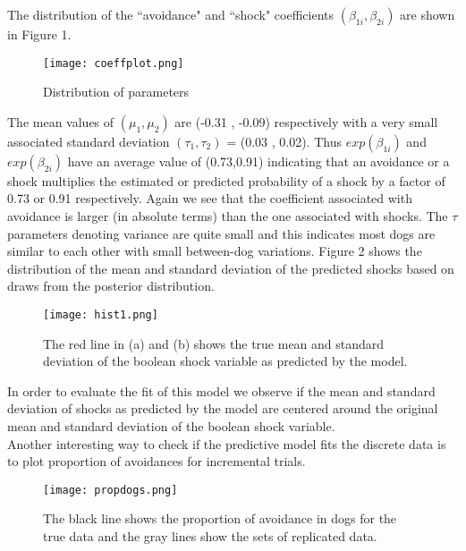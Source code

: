 \documentclass{article}
\begin{document}
The distribution of the ``avoidance" and ``shock" coefficients $(\beta_{1i},\beta_{2i})$ are shown in Figure 1.
 \begin{figure}[H]
\centering
\texttt{[image: coeffplot.png]}
\caption{Distribution of parameters}
\label{deltat}
\end{figure}
The mean values of $(\mu_1, \mu_2)$ are (-0.31 , -0.09) respectively with a very small associated standard deviation $(\tau_1, \tau_2)$ = (0.03 , 0.02). Thus $exp(\beta_{1i})$ and $exp(\beta_{2i})$ have an average value of (0.73,0.91) indicating that an avoidance or a shock multiplies the estimated or predicted probability of a shock by a factor of 0.73 or 0.91 respectively. Again we see that the coefficient associated with avoidance is larger (in absolute terms) than the one associated with shocks. The $\tau$ parameters denoting variance are quite small and this indicates most dogs are similar to each other with small between-dog variations. Figure 2 shows the distribution of the mean and standard deviation of the predicted shocks based on draws from the posterior distribution.
 \begin{figure}[H]
\centering
\texttt{[image: hist1.png]}
\caption{The red line in (a) and (b) shows the true mean and standard deviation of the boolean shock variable as predicted by the model.}
\label{deltat}
\end{figure}
\newpage
In order to evaluate the fit of this model we observe if the mean and standard deviation of shocks as predicted by the model are centered around the original mean and standard deviation of the boolean shock variable.\\
Another interesting way to check if the predictive model fits the discrete data is to plot proportion of avoidances for incremental trials.
 \begin{figure}[H]
\centering
\texttt{[image: propdogs.png]}
\caption{The black line shows the proportion of avoidance in dogs for the true data and the gray lines show the sets of replicated data.}
\label{deltat}
\end{figure}
\end{document}
